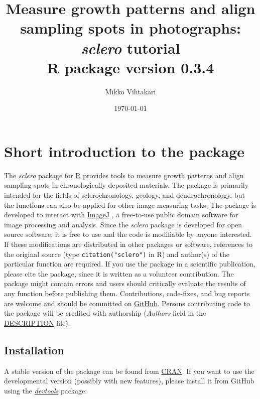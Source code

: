 \documentclass[11pt, a4paper]{article}
\title{Measure growth patterns and align sampling spots in photographs: \textit{sclero} tutorial \\[0.2em] \large R package version 0.3.4}
\newcommand{\sclero}{\textit{sclero}\xspace}
\begin{document}
\author{Mikko Vihtakari}
\date{\today}
\maketitle

\tableofcontents




\reversemarginpar

\newpage

\section{Short introduction to the package}

The \sclero package for \href{http://www.r-project.org}{R} \citep{R2014} provides tools to measure growth patterns and align sampling spots in chronologically deposited materials. The package is primarily intended for the fields of sclerochronology, geology, and dendrochronology, but the functions can also be applied for other image measuring tasks. The package is developed to interact with \href{http://imagej.nih.gov/ij/}{ImageJ} \citep{Schneider2012}, a free-to-use public domain software for image processing and analysis. Since the \sclero package is developed for open source software, it is free to use and the code is modifiable by anyone interested. If these modifications are distributed in other packages or software, references to the original source (type \texttt{citation("sclero")} in R) and author(s) of the particular function are required. If you use the package in a scientific publication, please cite the package, since it is written as a volunteer contribution. The package might contain errors and users should critically evaluate the results of any function before publishing them. Contributions, code-fixes, and bug reports are welcome and should be committed on \href{https://github.com/MikkoVihtakari/sclero}{GitHub}. Persons contributing code to the package will be credited with authorship (\textit{Authors} field in the \href{https://github.com/MikkoVihtakari/sclero/blob/master/DESCRIPTION}{DESCRIPTION} file).

\subsection{Installation}

A stable version of the package can be found from \href{https://cran.r-project.org/package=sclero}{CRAN}. If you want to use the developmental version (possibly with new features), please install it from GitHub using the \href{https://cran.r-project.org/web/packages/devtools/index.html}{\textit{devtools}} package:
\end{document}
